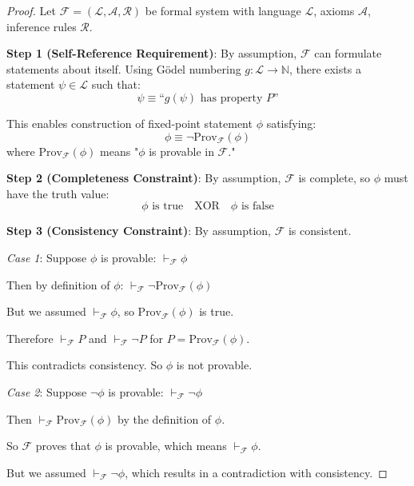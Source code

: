\documentclass[11pt,onecolumn]{article}
\begin{document}
\begin{proof}
Let $\mathcal{F} = (\mathcal{L}, \mathcal{A}, \mathcal{R})$ be formal system with language $\mathcal{L}$, axioms $\mathcal{A}$, inference rules $\mathcal{R}$.

\textbf{Step 1 (Self-Reference Requirement)}: By assumption, $\mathcal{F}$ can formulate statements about itself. Using G\"odel numbering $g: \mathcal{L} \to \mathbb{N}$, there exists a statement $\psi \in \mathcal{L}$ such that:
\begin{equation}
\psi \equiv \text{``}g(\psi) \text{ has property } P\text{''}
\end{equation}

This enables construction of fixed-point statement $\phi$ satisfying:
\begin{equation}
\phi \equiv \neg \text{Prov}_{\mathcal{F}}(\phi)
\end{equation}
where $\text{Prov}_{\mathcal{F}}(\phi)$ means "$\phi$ is provable in $\mathcal{F}$."

\textbf{Step 2 (Completeness Constraint)}: By assumption, $\mathcal{F}$ is complete, so $\phi$ must have the truth value:
\begin{equation}
\phi \text{ is true} \quad \text{XOR} \quad \phi \text{ is false}
\end{equation}

\textbf{Step 3 (Consistency Constraint)}: By assumption, $\mathcal{F}$ is consistent.

\textit{Case 1}: Suppose $\phi$ is provable: $\vdash_{\mathcal{F}} \phi$

Then by definition of $\phi$: $\vdash_{\mathcal{F}} \neg \text{Prov}_{\mathcal{F}}(\phi)$

But we assumed $\vdash_{\mathcal{F}} \phi$, so $\text{Prov}_{\mathcal{F}}(\phi)$ is true.

Therefore $\vdash_{\mathcal{F}} P$ and $\vdash_{\mathcal{F}} \neg P$ for $P = \text{Prov}_{\mathcal{F}}(\phi)$.

This contradicts consistency. So $\phi$ is not provable.

\textit{Case 2}: Suppose $\neg \phi$ is provable: $\vdash_{\mathcal{F}} \neg \phi$

Then $\vdash_{\mathcal{F}} \text{Prov}_{\mathcal{F}}(\phi)$ by the definition of $\phi$.

So $\mathcal{F}$ proves that $\phi$ is provable, which means $\vdash_{\mathcal{F}} \phi$.

But we assumed $\vdash_{\mathcal{F}} \neg \phi$, which results in a contradiction with consistency.


\end{proof}
\end{document}
